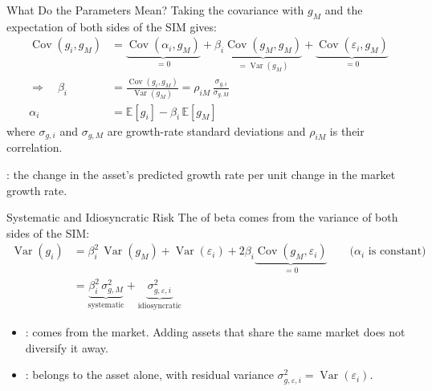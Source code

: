 \documentclass[aspectratio=169,11pt]{beamer}
\newcommand{\E}{\mathbb{E}}
\newcommand{\Var}{\operatorname{Var}}
\newcommand{\Cov}{\operatorname{Cov}}
\begin{document}
\begin{frame}{What Do the Parameters Mean?}
  Taking the covariance with $g_M$ and the expectation of both sides of the SIM
  gives:
  \[
    \begin{aligned}
      \Cov(g_i,g_M)&=\underbrace{\Cov(\alpha_i,g_M)}_{=0}
        +\beta_i\underbrace{\Cov(g_M,g_M)}_{=\Var(g_M)}
        +\underbrace{\Cov(\varepsilon_i,g_M)}_{=0}\\[0.2em]
      \Longrightarrow\quad\beta_i&=\boxed{\frac{\Cov(g_i,g_M)}{\Var(g_M)}
        =\rho_{iM}\,\frac{\sigma_{g,i}}{\sigma_{g,M}}}\\[0.2em]
      \alpha_i&=\E[g_i]-\beta_i\,\E[g_M]
    \end{aligned}
  \]
  where $\sigma_{g,i}$ and $\sigma_{g,M}$ are growth-rate standard deviations and
  $\rho_{iM}$ is their correlation.

  \vspace{0.4em}
  : the change in the asset's predicted
  growth rate per unit change in the market growth rate.
\end{frame}

\begin{frame}{Systematic and Idiosyncratic Risk}
  The  of beta comes from the variance of both sides
  of the SIM:
  \[
    \begin{aligned}
      \Var(g_i)&=\beta_i^2\,\Var(g_M)+\Var(\varepsilon_i)
        +2\beta_i\underbrace{\Cov(g_M,\varepsilon_i)}_{=0}
        \qquad\text{($\alpha_i$ is constant)}\\[0.2em]
      &=\boxed{\underbrace{\beta_i^2\,\sigma^2_{g,M}}_{\text{systematic}}
        +\underbrace{\sigma^2_{g,\varepsilon,i}}_{\text{idiosyncratic}}}
    \end{aligned}
  \]
  \begin{itemize}\setlength{\itemsep}{0.5em}
    \item {}: comes from the market. Adding assets that share
      the same market does not diversify it away.
    \item {}: belongs to the asset alone, with residual
      variance $\sigma^2_{g,\varepsilon,i}=\Var(\varepsilon_i)$.
  \end{itemize}
\end{frame}
\end{document}
